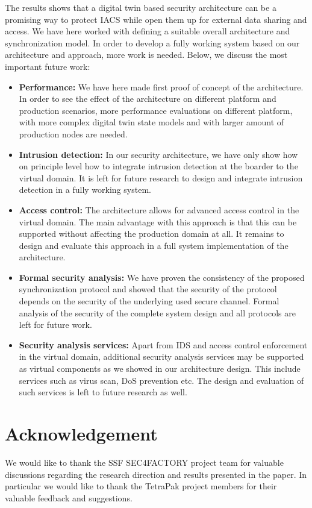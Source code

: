 The results shows that a digital twin based security architecture can be a promising way to protect IACS while open them up for external data sharing and access. We have here worked with defining a suitable overall architecture and synchronization model. In order to develop a fully working system based on our architecture and approach, more work is needed. Below, we discuss the most important future work:
\begin{itemize}
\item \textbf{Performance:} We have here made first proof of concept of the architecture. In order to see the effect of the architecture on different platform and production scenarios, more performance evaluations on different platform, with more complex digital twin state models and with larger amount of production nodes are needed. 
\item \textbf{Intrusion detection:} In our security architecture, we have only show how on principle level how  to integrate intrusion detection at the boarder to the virtual domain. It is left for future research to design and integrate intrusion detection in a fully working system.
\item \textbf{Access control:} The architecture allows for advanced access control in the virtual domain. The main advantage with this approach is that this can be supported without affecting the production domain at all. It remains to design and evaluate this approach in a full system implementation of the architecture.
\item\textbf{Formal security analysis:} We have proven the consistency of the proposed synchronization protocol and showed that the security of the protocol depends on the security of the underlying used secure channel. Formal analysis of the security of the complete system design and all protocols are left for future work. 
\item \textbf{Security analysis services:} Apart from IDS and access control enforcement in the virtual domain, additional security analysis services may be supported as virtual components as we showed in our architecture design. This include services such as virus scan, DoS prevention etc. The design and evaluation of such services is left to future research as well.
\end{itemize}

\section*{Acknowledgement}
We would like to thank the SSF SEC4FACTORY project team for valuable discussions regarding the research direction and results presented in the paper. In particular we would like to thank the TetraPak project members for their valuable feedback and suggestions.

{\raggedright
        \printbibliography[segment=\therefsegment,heading=subbibliography]
}

